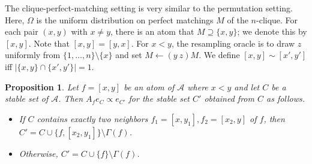 \documentclass[11pt]{article}
\newtheorem{proposition}[theorem]{Proposition}
\begin{document}
 
 The clique-perfect-matching setting is very similar to the permutation setting. Here, $\Omega$ is the uniform distribution on perfect matchings $M$ of the $n$-clique. For each pair $(x,y)$ with $x \neq y$, there is an atom that $M \supseteq \{x, y \}$; we denote this by $[x,y]$. Note that $[x,y] = [y,x]$. For $x < y$, the resampling oracle is to draw $z$ uniformly from $\{1, \dots, n \} \setminus \{x \}$ and set $M \leftarrow (y \ z) M$. We define $[x,y] \sim [x', y']$ iff $| \{x, y \} \cap \{x' , y' \} | = 1$.

\begin{proposition}
\label{add-1-prop2}
Let $f = [x,y]$ be an atom of $\mathcal A$ where $x < y$ and let $C$ be a stable set of $\mathcal A$. Then $A_f e_{C} \propto e_{C'}$ for the stable set $C'$ obtained from $C$ as follows. %
\begin{itemize}
\item If $C$ contains exactly two neighbors $f_1 = [x,y_1], f_2 = [x_2,y]$ of $f$, then $C' = C \cup \{ f, [x_2, y_1] \} \setminus \Gamma(f)$.
\item Otherwise, $C' = C \cup \{f \} \setminus  \Gamma(f)$.
\end{itemize}
\end{proposition}

\end{document}
